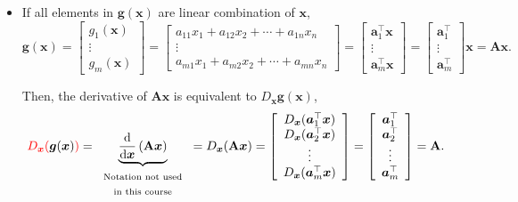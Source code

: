 \documentclass[12pt,thmsa]{article}
\begin{document}
\newpage
	
\begin{itemize}
	\item If all elements in \(\boldsymbol{g}( \boldsymbol{x} )\) are linear combination of \(\boldsymbol{x}\),
	\[ \boldsymbol{g}( \boldsymbol{x} )
	=\left[
	\begin{array}{c}{
			g_{1}(\boldsymbol{x})} \\ 
		{\vdots} \\ 
		{g_{m}(\boldsymbol{x})}
	\end{array}
	\right]
	=\left[
	\begin{array}{c}{
			a_{11} x_{1}+a_{12} x_{2}+\cdots+a_{1 n} x_{n}} \\ 
		{\vdots} \\ 
		{a_{m 1} x_{1}+a_{m 2} x_{2}+\cdots+a_{m n} x_{n}}
	\end{array}
	\right]
	=\left[
	\begin{array}{c}{
			\boldsymbol{a}_{1}^{\top} \boldsymbol{x}} \\ 
		{\vdots} \\ 
		{\boldsymbol{a}_{m}^{\top}\boldsymbol{x}}
	\end{array}
	\right]
	=\left[
	\begin{array}{c}{\boldsymbol{a}_{1}^{\top}} \\ {\vdots} \\ {\boldsymbol{a}_{m}^{\top}}\end{array}
	\right] \boldsymbol{x}
	= \mathbf{A} \boldsymbol{x}.
	\]
	
	Then, the derivative of \(\mathbf{A} \boldsymbol{x}\) is equivalent to \( D_{\boldsymbol{x}} \boldsymbol{g}( \boldsymbol{x} ) \),
	\[ {\color{red}{ D_{\boldsymbol{x}}( }} \boldsymbol{g}( \boldsymbol{x} ) {\color{red}{ ) }} 
	= \underbrace{\frac{\mathrm{d}}{\mathrm{d} \boldsymbol{x}} \left(  \mathbf{A} \boldsymbol{x} \right)}_{\text{\begin{tabular}{c} Notation not used \\ in this course \end{tabular}}}
	= {\color{black}{ D_{\boldsymbol{x}}( }} \mathbf{A} \boldsymbol{x} {\color{black}{ ) }} 
	= \left[
		\begin{array}{c}
			{\color{black}{D_{\boldsymbol{x}}(}}{ \boldsymbol{a}_{1}^{\top} \boldsymbol{x} }{\color{black})} \\
			{\color{black}{D_{\boldsymbol{x}}(}}{ \boldsymbol{a}_{2}^{\top} \boldsymbol{x} }{\color{black})} \\
			\vdots \\
			{\color{black}{D_{\boldsymbol{x}}(}}{ \boldsymbol{a}_{m}^{\top} \boldsymbol{x} }{\color{black})}
		\end{array}
		\right]
	= \left[
		\begin{array}{c}
			\boldsymbol{a}_{1}^{\top}\\
			\boldsymbol{a}_{2}^{\top}\\
			\vdots \\
			\boldsymbol{a}_{m}^{\top}
		\end{array}
		\right]
	= \mathbf{A}.
	\]
	

\end{itemize}
\end{document}

